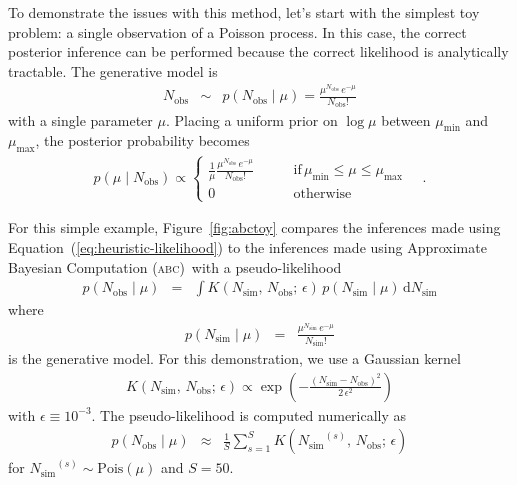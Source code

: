 \documentclass[manuscript, letterpaper]{aastex}
\newcommand{\accronym}[1]{\textsc{#1}}
\newcommand{\dfmfigref}[1]{\ref{fig:#1}}
\newcommand{\dfmFig}[1]{Figure~\dfmfigref{#1}}
\newcommand{\dfmfig}[1]{\dfmFig{#1}}
\renewcommand{\eqref}[1]{\ref{eq:#1}}
\newcommand{\Eq}[1]{Equation~(\eqref{#1})}
\newcommand{\eq}[1]{\Eq{#1}}
\newcommand{\dd}{\ensuremath{\,\mathrm{d}}}
\newcommand{\obs}{{\ensuremath{\mathrm{obs}}}}
\newcommand{\simu}{{\ensuremath{\mathrm{sim}}}}
\def\abc{Approximate Bayesian Computation (\accronym{abc})\def\abc{\accronym{abc}}}
\begin{document}
To demonstrate the issues with this method, let's start with the simplest toy
problem: a single observation of a Poisson process.
In this case, the correct posterior inference can be performed because the
correct likelihood is analytically tractable.
The generative model is
\begin{eqnarray}
N_\obs &\sim& p(N_\obs\mid\mu) = \frac{\mu^{N_\obs}\,e^{-\mu}}{N_\obs!}
\end{eqnarray}
with a single parameter $\mu$.
Placing a uniform prior on $\log\mu$ between $\mu_\mathrm{min}$ and
$\mu_\mathrm{max}$, the posterior probability becomes
\begin{eqnarray}
p(\mu\mid N_\obs) \propto \left\{\begin{array}{ll}
    \frac{1}{\mu}\frac{\mu^{N_\obs}\,e^{-\mu}}{N_\obs!}\quad & \quad
       \mathrm{if}\,\mu_\mathrm{min} \le \mu \le \mu_\mathrm{max} \\
    0 \quad & \quad \mathrm{otherwise}
\end{array}\right. \quad.
\end{eqnarray}

For this simple example, \dfmfig{abctoy} compares the inferences made using
\eq{heuristic-likelihood} to the inferences made using \abc\ with a
pseudo-likelihood
\begin{eqnarray}
p(N_\obs\mid\mu) &=& \int K(N_\simu,\,N_\obs;\,\epsilon)\,
    p(N_\simu\mid\mu) \dd N_\simu
\end{eqnarray}
where
\begin{eqnarray}
p(N_\simu\mid\mu) &=& \frac{\mu^{N_\simu}\,e^{-\mu}}{N_\simu!}
\end{eqnarray}
is the generative model.
For this demonstration, we use a Gaussian kernel
\begin{eqnarray}
K(N_\simu,\,N_\obs;\,\epsilon) \propto \exp\left(
    -\frac{(N_\simu - N_\obs)^2}{2\,\epsilon^2}
\right)
\end{eqnarray}
with $\epsilon \equiv 10^{-3}$.
The pseudo-likelihood is computed numerically as
\begin{eqnarray}
p(N_\obs\mid\mu) &\approx& \frac{1}{S}\sum_{s=1}^S
    K({N_\simu}^{(s)},\,N_\obs;\,\epsilon)
\end{eqnarray}
for ${N_\simu}^{(s)} \sim \mathrm{Pois}(\mu)$ and $S = 50$.
\end{document}

